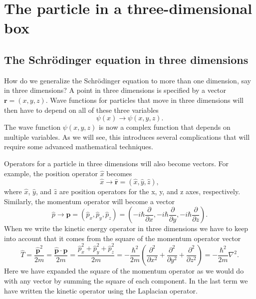
\section{The particle in a three-dimensional box}
\subsection{The Schr\"{o}dinger equation in three dimensions}
How do we generalize the Schr\"{o}dinger equation to more than one dimension, say in three dimensions?
A point in three dimensions is specified by a vector $\mathbf{r} = (x,y,z)$.
Wave functions for particles that move in three dimensions will then have to depend on all of these three variables
\begin{equation}
\psi(x) \rightarrow \psi(x,y,z).
\end{equation}
The wave function $\psi(x,y,z)$ is now a complex function that depends on multiple variables.
As we will see, this introduces several complications that will require some advanced mathematical techniques.

Operators for a particle in three dimensions will also become vectors.
For example, the position operator $\hat{x}$ becomes
\begin{equation}
\hat{x} \rightarrow \hat{\mathbf{r}} = (\hat{x}, \hat{y}, \hat{z}),
\end{equation}
where $\hat{x}$, $\hat{y}$, and $\hat{z}$ are position operators for the x, y, and z axes, respectively.
Similarly, the momentum operator will become a vector
\begin{equation}
\hat{p} \rightarrow \hat{\mathbf{p}} =  (\hat{p}_{x}, \hat{p}_{y}, \hat{p}_{z})
= \left(-i\hbar\frac{\partial}{\partial x}, -i\hbar\frac{\partial}{\partial y}, -i\hbar\frac{\partial}{\partial z}\right).
\end{equation}
When we write the kinetic energy operator in three dimensions we have to keep into account that it comes from the square of the momentum operator vector
\begin{equation}
\hat{T} = \frac{\hat{\mathbf{p}}^2}{2m}
= \frac{\hat{\mathbf{p}} \cdot \hat{\mathbf{p}}}{2m} 
= \frac{\hat{p}_{x}^2 + \hat{p}_{y}^2 + \hat{p}_{z}^2}{2m} 
= -\frac{\hbar^2}{2m}
\left(\frac{\partial^2}{\partial x^2} + \frac{\partial^2}{\partial y^2} + \frac{\partial^2}{\partial z^2} \right) = -\frac{\hbar^2}{2m}\nabla^2.
\end{equation}
Here we have expanded the square of the momentum operator as we would do with any vector by summing the square of each component.
In the last term we have written the kinetic operator using the Laplacian operator.

